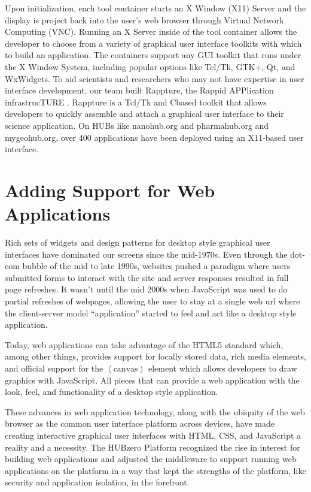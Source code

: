 \documentclass[conference]{../sty/IEEEtran}
\newcommand\CC{C\nolinebreak[4]\hspace{-.05em}\raisebox{.4ex}{\relsize{-3}{\textbf{++}}}\hspace{.25em}}
\begin{document}
Upon initialization, each tool container starts an X Window (X11) Server and the
display is project back into the user's web browser through Virtual Network
Computing (VNC).  Running an X Server inside of the tool container allows the
developer to choose from a variety of graphical user interface toolkits with
which to build an application. The containers support any GUI toolkit that runs
under the X Window System, including popular options like Tcl/Tk, GTK+, Qt, and
WxWidgets.  To aid scientists and researchers who may not have expertise in
user interface development, our team built Rappture, the Rappid APPlication
infrastrucTURE \cite{rappture}.  Rappture is a Tcl/Tk and \CC based toolkit
that allows developers to quickly assemble and attach a graphical user
interface to their science application. On HUBs like nanohub.org and
pharmahub.org and mygeohub.org, over 400 applications have been deployed using
an X11-based user interface.



\section {Adding Support for Web Applications}

Rich sets of widgets and design patterns for desktop style graphical user
interfaces have dominated our screens since the mid-1970s. Even through the
dot-com bubble of the mid to late 1990s, websites pushed a paradigm where users
submitted forms to interact with the site and server responses resulted in full
page refreshes. It wasn't until the mid 2000s when JavaScript was used to do
partial refreshes of webpages, allowing the user to stay at a single web url
where the client-server model ``application'' started to feel and act like a
desktop style application.

Today, web applications can take advantage of the HTML5 standard which, among
other things, provides support for locally stored data, rich media elements,
and official support for the $\left\langle\text{canvas}\right\rangle$ element which allows
developers to draw graphics with JavaScript. All pieces that can provide a web
application with the look, feel, and functionality of a desktop style
application.

These advances in web application technology, along with the ubiquity of the
web browser as the common user interface platform across devices, have made
creating interactive graphical user interfaces with HTML, CSS, and JavaScript a
reality and a necessity. The HUBzero Platform recognized the rise in interest
for building web applications and adjusted the middleware to support running
web applications on the platform in a way that kept the strengths of the
platform, like security and application isolation, in the forefront.
\end{document}
